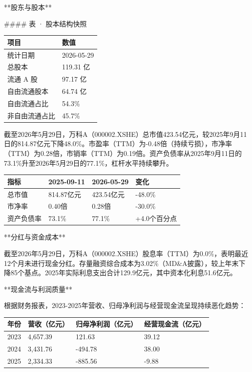 \documentclass[12pt,a4paper]{article}
\begin{document}
**股东与股本**

\#\#\#\# 表 · 股本结构快照

\begin{table}[htbp]
\centering
\begin{tabular}{ll}
\toprule
项目 & 数值 \\
\midrule
统计日期 & 2026-05-29 \\
总股本 & 119.31 亿 \\
流通 A 股 & 97.17 亿 \\
自由流通股本 & 64.74 亿 \\
自由流通占比 & 54.3\% \\
非自由流通占比 & 45.7\% \\
\bottomrule
\end{tabular}
\end{table}


截至2026年5月29日，万科A（000002.XSHE）总市值423.54亿元，较2025年9月11日的814.87亿元下降48.0\%。市盈率（TTM）为-0.48倍（持续亏损），市净率（TTM）为0.28倍，市销率（TTM）为0.19倍。资产负债率从2025年9月11日的73.1\%升至2026年5月29日的77.1\%，杠杆水平持续攀升。

\begin{table}[htbp]
\centering
\begin{tabular}{llll}
\toprule
指标 & 2025-09-11 & 2026-05-29 & 变化 \\
\midrule
总市值 & 814.87亿元 & 423.54亿元 & -48.0\% \\
市净率 & 0.40倍 & 0.28倍 & -30.0\% \\
资产负债率 & 73.1\% & 77.1\% & +4.0个百分点 \\
\bottomrule
\end{tabular}
\end{table}


**分红与资金成本**

截至2026年5月29日，万科A（000002.XSHE）股息率（TTM）为0.0\%，表明最近12个月未进行现金分红。存量融资综合成本为3.02\%（MD\&A披露），较上年末下降85个基点。2025年实际利息支出合计129.9亿元，其中资本化利息51.6亿元。

**现金流与利润质量**

根据财务报表，2023-2025年营收、归母净利润与经营现金流呈现持续恶化趋势：

\begin{table}[htbp]
\centering
\begin{tabular}{llll}
\toprule
年份 & 营收（亿元） & 归母净利润（亿元） & 经营现金流（亿元） \\
\midrule
2023 & 4,657.39 & 121.63 & 39.12 \\
2024 & 3,431.76 & -494.78 & 38.00 \\
2025 & 2,334.33 & -885.56 & -9.88 \\
\bottomrule
\end{tabular}
\end{table}
\end{document}
